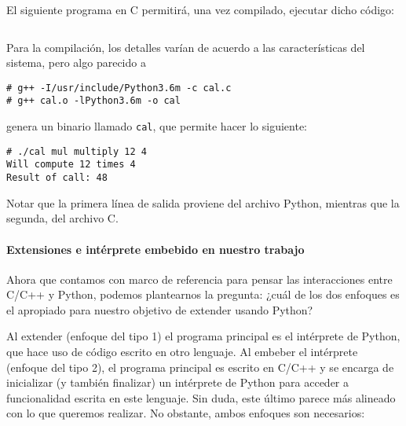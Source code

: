 \inputminted{Python}{codelistings/multiply.py}

El siguiente programa en C permitirá, una vez compilado, ejecutar dicho código:

\inputminted{c}{codelistings/use_multiply.c}

Para la compilación, los detalles varían de acuerdo a las características del
sistema, pero algo parecido a

\begin{verbatim}
# g++ -I/usr/include/Python3.6m -c cal.c
# g++ cal.o -lPython3.6m -o cal
\end{verbatim}

genera un binario llamado \verb!cal!, que permite hacer lo siguiente:

\begin{verbatim}
# ./cal mul multiply 12 4
Will compute 12 times 4
Result of call: 48
\end{verbatim}

Notar que la primera línea de salida proviene del archivo Python, mientras que
la segunda, del archivo C.

\paragraph{Extensiones e intérprete embebido en nuestro trabajo}

Ahora que contamos con marco de referencia para pensar las interacciones entre
C/C++ y Python, podemos plantearnos la pregunta: ¿cuál de los dos enfoques es
el apropiado para nuestro objetivo de extender \omnetpp{} usando Python?

Al extender (enfoque del tipo 1) el programa principal es el intérprete de
Python, que hace uso de código escrito en otro lenguaje. Al embeber el
intérprete (enfoque del tipo 2), el programa principal es escrito en C/C++ y se
encarga de inicializar (y también finalizar) un intérprete de Python para
acceder a funcionalidad escrita en este lenguaje. Sin duda, este último parece
más alineado con lo que queremos realizar. No obstante, ambos enfoques son
necesarios:


